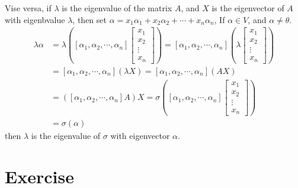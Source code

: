\documentclass{article}
\theoremstyle{definition}
\begin{document}
Vise versa, if $\lambda$ is the eigenvalue of the matrix $A$, and $X$ is the eigenvector of $A$ with eigenbvalue $\lambda$,
 then set $\alpha=x_{1}\alpha_{1}+x_{2}\alpha_{2}+\cdots+x_{n}\alpha_{n}$,
If $\alpha\in V$, and $\alpha\neq \theta$.
\begin{align*}
    \lambda\alpha&=\lambda([\alpha_{1},\alpha_{2},\cdots,\alpha_{n}]\begin{bmatrix}x_{1}\\x_{2}\\\vdots\\x_{n}\end{bmatrix})
    =[\alpha_{1},\alpha_{2},\cdots,\alpha_{n}](\lambda\begin{bmatrix}x_{1}\\x_{2}\\\vdots\\x_{n}\end{bmatrix})\\
    &=[\alpha_{1},\alpha_{2},\cdots,\alpha_{n}](\lambda X)=[\alpha_{1},\alpha_{2},\cdots,\alpha_{n}](AX)\\
    &=([\alpha_{1},\alpha_{2},\cdots,\alpha_{n}]A)X=\sigma([\alpha_{1},\alpha_{2},\cdots,\alpha_{n}]\begin{bmatrix}x_{1}\\x_{2}\\\vdots\\x_{n}\end{bmatrix})\\
    &=\sigma(\alpha)
\end{align*}
then $\lambda$ is the eigenvalue of $\sigma$ with eigenvector $\alpha$.



















\section{Exercise}
\end{document}
